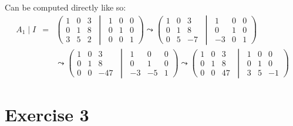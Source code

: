 \documentclass[a4paper]{scrreprt}
\begin{document}
Can be computed directly like so:
\begin{eqnarray*}
    A_1\mid I &=& \left(\begin{matrix}1 & 0 & 3 \\ 0 & 1 & 8 \\ 3 & 5 & 2\end{matrix}
        \ \middle\vert\ \begin{matrix}1 & 0 & 0 \\ 0 & 1 & 0 \\ 0 & 0 & 1\end{matrix}\right)
    \leadsto\left(\begin{matrix}1 & 0 & 3 \\ 0 & 1 & 8 \\ 0 & 5 & -7\end{matrix}
        \ \middle\vert\ \begin{matrix}1 & 0 & 0 \\ 0 & 1 & 0 \\ -3 & 0 & 1\end{matrix}\right)\\
    &&\leadsto\left(\begin{matrix}1 & 0 & 3 \\ 0 & 1 & 8 \\ 0 & 0 & -47\end{matrix}
        \ \middle\vert\ \begin{matrix}1 & 0 & 0 \\ 0 & 1 & 0 \\ -3 & -5 & 1\end{matrix}\right)
    \leadsto\left(\begin{matrix}1 & 0 & 3 \\ 0 & 1 & 8 \\ 0 & 0 & 47\end{matrix}
        \ \middle\vert\ \begin{matrix}1 & 0 & 0 \\ 0 & 1 & 0 \\ 3 & 5 & -1\end{matrix}\right)
\end{eqnarray*}

\section*{Exercise 3}
\end{document}
